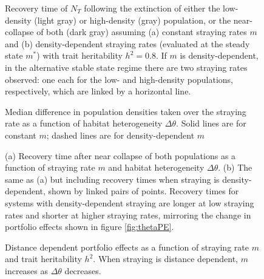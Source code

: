 \documentclass{revtex4}
\begin{document}
\begin{figure}
  \captionsetup{justification=raggedright,
singlelinecheck=false
}
\centering
\caption{
Recovery time of $N_T$ following the extinction of either the low-density (light gray) or high-density (gray) population, or the near-collapse of both (dark gray) assuming (a) constant straying rates $m$ and (b) density-dependent straying rates (evaluated at the steady state $m^*$) with trait heritability $h^2=0.8$.
If $m$ is density-dependent, in the alternative stable state regime there are two straying rates observed: one each for the low- and high-density populations, respectively, which are linked by a horizontal line.
} \label{fig:relax_highh}
\end{figure}

\clearpage


\begin{figure}
  \captionsetup{justification=raggedright,
singlelinecheck=false
}
\centering
\caption{
Median difference in population densities taken over the straying rate as a function of habitat heterogeneity $\Delta\theta$.
Solid lines are for constant $m$; dashed lines are for density-dependent $m$} \label{fig:thetadiffN}
\end{figure}


\begin{figure}
  \captionsetup{justification=raggedright,
singlelinecheck=false
}
\centering
\caption{
(a) Recovery time after near collapse of both populations as a function of straying rate $m$ and habitat heterogeneity $\Delta\theta$.
(b) The same as (a) but including recovery times when straying is density-dependent, shown by linked pairs of points.
Recovery times for systems with density-dependent straying are longer at low straying rates and shorter at higher straying rates, mirroring the change in portfolio effects shown in figure \ref{fig:thetaPE}.
} \label{fig:relaxtheta}
\end{figure}



\begin{figure}
  \captionsetup{justification=raggedright,
singlelinecheck=false
}
  \centering
  \caption{
  Distance dependent portfolio effects as a function of straying rate $m$ and trait heritability $h^2$. When straying is distance dependent, $m$ increases as $\Delta\theta$ decreases.
  } \label{fig:mthetaPE}
\end{figure}
\end{document}
